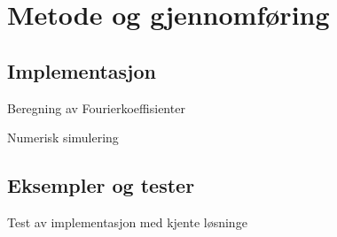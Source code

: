 \section{Metode og gjennomføring}

\subsection{Implementasjon}

Beregning av Fourierkoeffisienter

Numerisk simulering

\subsection{Eksempler og tester }
Test av implementasjon med kjente løsninge
